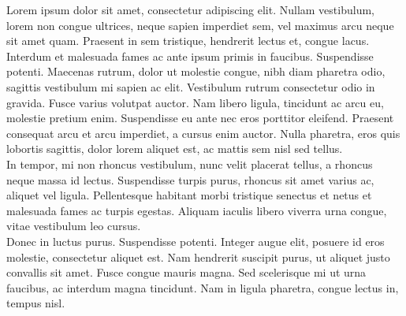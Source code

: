 \documentclass[a4paper,12pt]{article}
\begin{document}

\begin{coverletter}
    Lorem ipsum dolor sit amet, consectetur adipiscing elit. Nullam vestibulum, lorem non congue ultrices, neque sapien imperdiet sem, vel maximus arcu neque sit amet quam. Praesent in sem tristique, hendrerit lectus et, congue lacus. \\

    Interdum et malesuada fames ac ante ipsum primis in faucibus. Suspendisse potenti. Maecenas rutrum, dolor ut molestie congue, nibh diam pharetra odio, sagittis vestibulum mi sapien ac elit. Vestibulum rutrum consectetur odio in gravida. Fusce varius volutpat auctor. Nam libero ligula, tincidunt ac arcu eu, molestie pretium enim. Suspendisse eu ante nec eros porttitor eleifend. Praesent consequat arcu et arcu imperdiet, a cursus enim auctor. Nulla pharetra, eros quis lobortis sagittis, dolor lorem aliquet est, ac mattis sem nisl sed tellus. \\

    In tempor, mi non rhoncus vestibulum, nunc velit placerat tellus, a rhoncus neque massa id lectus. Suspendisse turpis purus, rhoncus sit amet varius ac, aliquet vel ligula. Pellentesque habitant morbi tristique senectus et netus et malesuada fames ac turpis egestas. Aliquam iaculis libero viverra urna congue, vitae vestibulum leo cursus. \\

    Donec in luctus purus. Suspendisse potenti. Integer augue elit, posuere id eros molestie, consectetur aliquet est. Nam hendrerit suscipit purus, ut aliquet justo convallis sit amet. Fusce congue mauris magna. Sed scelerisque mi ut urna faucibus, ac interdum magna tincidunt. Nam in ligula pharetra, congue lectus in, tempus nisl. \\
\end{coverletter}
\end{document}
